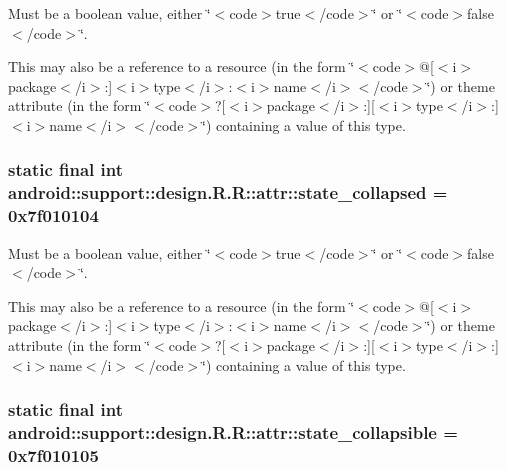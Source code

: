 Must be a boolean value, either \char`\"{}$<$code$>$true$<$/code$>$\char`\"{} or \char`\"{}$<$code$>$false$<$/code$>$\char`\"{}. 

This may also be a reference to a resource (in the form \char`\"{}$<$code$>$@\mbox{[}$<$i$>$package$<$/i$>$:\mbox{]}$<$i$>$type$<$/i$>$:$<$i$>$name$<$/i$>$$<$/code$>$\char`\"{}) or theme attribute (in the form \char`\"{}$<$code$>$?\mbox{[}$<$i$>$package$<$/i$>$:\mbox{]}\mbox{[}$<$i$>$type$<$/i$>$:\mbox{]}$<$i$>$name$<$/i$>$$<$/code$>$\char`\"{}) containing a value of this type. \hypertarget{classandroid_1_1support_1_1design_1_1_r_1_1attr_07daaf558370f16bb33595bcb87b135f}{
\subsubsection[{state\_\-collapsed}]{\setlength{\rightskip}{0pt plus 5cm}static final int android::support::design.R.R::attr::state\_\-collapsed = 0x7f010104}}
\label{classandroid_1_1support_1_1design_1_1_r_1_1attr_07daaf558370f16bb33595bcb87b135f}


Must be a boolean value, either \char`\"{}$<$code$>$true$<$/code$>$\char`\"{} or \char`\"{}$<$code$>$false$<$/code$>$\char`\"{}. 

This may also be a reference to a resource (in the form \char`\"{}$<$code$>$@\mbox{[}$<$i$>$package$<$/i$>$:\mbox{]}$<$i$>$type$<$/i$>$:$<$i$>$name$<$/i$>$$<$/code$>$\char`\"{}) or theme attribute (in the form \char`\"{}$<$code$>$?\mbox{[}$<$i$>$package$<$/i$>$:\mbox{]}\mbox{[}$<$i$>$type$<$/i$>$:\mbox{]}$<$i$>$name$<$/i$>$$<$/code$>$\char`\"{}) containing a value of this type. \hypertarget{classandroid_1_1support_1_1design_1_1_r_1_1attr_d4468685188f1eab123d2493625c701d}{
\subsubsection[{state\_\-collapsible}]{\setlength{\rightskip}{0pt plus 5cm}static final int android::support::design.R.R::attr::state\_\-collapsible = 0x7f010105}}
\label{classandroid_1_1support_1_1design_1_1_r_1_1attr_d4468685188f1eab123d2493625c701d}


